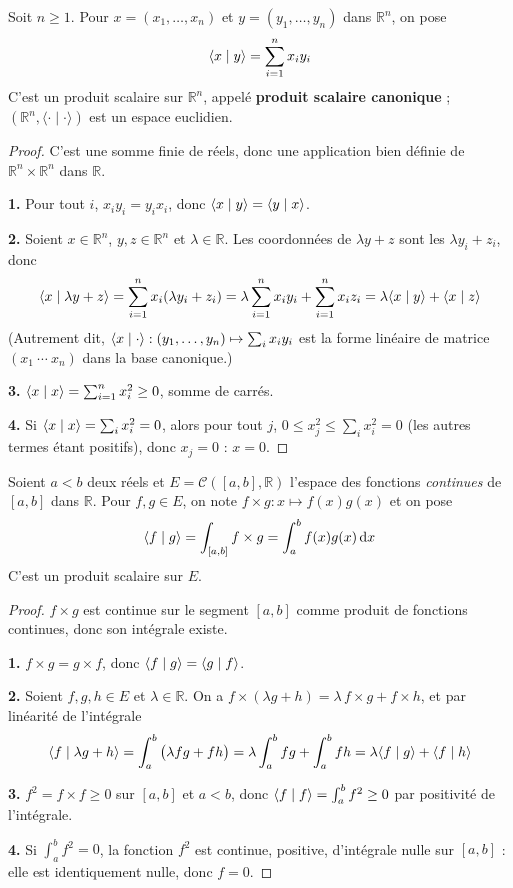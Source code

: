 \begin{exemple}
\label{ex:ps-canonique}
Soit $n\geq 1$. Pour $x=(x_1,\dots,x_n)$ et $y=(y_1,\dots,y_n)$ dans $\mathbb{R}^n$, on pose
\[\langle x\mid y\rangle=\sum_{i=1}^{n}x_iy_i\]
C'est un produit scalaire sur $\mathbb{R}^n$, appelé \textbf{produit scalaire canonique} ; $(\mathbb{R}^n,\langle\cdot\mid\cdot\rangle)$ est un espace euclidien.
\end{exemple}

\begin{proof}
C'est une somme finie de réels, donc une application bien définie de $\mathbb{R}^n\times\mathbb{R}^n$ dans $\mathbb{R}$.

\textbf{1.} Pour tout $i$, $x_iy_i=y_ix_i$, donc $\langle x\mid y\rangle=\langle y\mid x\rangle$.

\textbf{2.} Soient $x\in\mathbb{R}^n$, $y,z\in\mathbb{R}^n$ et $\lambda\in\mathbb{R}$. Les coordonnées de $\lambda y+z$ sont les $\lambda y_i+z_i$, donc
\[\langle x\mid \lambda y+z\rangle=\sum_{i=1}^nx_i(\lambda y_i+z_i)=\lambda\sum_{i=1}^nx_iy_i+\sum_{i=1}^nx_iz_i=\lambda\langle x\mid y\rangle+\langle x\mid z\rangle\]
(Autrement dit, $\langle x\mid \cdot\rangle:(y_1,\dots,y_n)\mapsto\sum_ix_iy_i$ est la forme linéaire de matrice $(x_1\ \cdots\ x_n)$ dans la base canonique.)

\textbf{3.} $\langle x\mid x\rangle=\sum_{i=1}^nx_i^2\geq 0$, somme de carrés.

\textbf{4.} Si $\langle x\mid x\rangle=\sum_ix_i^2=0$, alors pour tout $j$, $0\leq x_j^2\leq\sum_ix_i^2=0$ (les autres termes étant positifs), donc $x_j=0$ : $x=0$.
\end{proof}

\begin{exemple}
\label{ex:ps-integral}
Soient $a<b$ deux réels et $E=\mathcal{C}([a,b],\mathbb{R})$ l'espace des fonctions \emph{continues} de $[a,b]$ dans $\mathbb{R}$. Pour $f,g\in E$, on note $f\times g : x\mapsto f(x)g(x)$ et on pose
\[\langle f\mid g\rangle=\int_{[a,b]}f\times g=\int_a^bf(x)g(x)\,\mathrm{d}x\]
C'est un produit scalaire sur $E$.
\end{exemple}

\begin{proof}
$f\times g$ est continue sur le segment $[a,b]$ comme produit de fonctions continues, donc son intégrale existe.

\textbf{1.} $f\times g=g\times f$, donc $\langle f\mid g\rangle=\langle g\mid f\rangle$.

\textbf{2.} Soient $f,g,h\in E$ et $\lambda\in\mathbb{R}$. On a $f\times(\lambda g+h)=\lambda\,f\times g+f\times h$, et par linéarité de l'intégrale
\[\langle f\mid \lambda g+h\rangle=\int_a^b\big(\lambda fg+fh\big)=\lambda\int_a^bfg+\int_a^bfh=\lambda\langle f\mid g\rangle+\langle f\mid h\rangle\]

\textbf{3.} $f^2=f\times f\geq 0$ sur $[a,b]$ et $a<b$, donc $\langle f\mid f\rangle=\int_a^bf^2\geq 0$ par positivité de l'intégrale.

\textbf{4.} Si $\int_a^bf^2=0$, la fonction $f^2$ est continue, positive, d'intégrale nulle sur $[a,b]$ : elle est identiquement nulle, donc $f=0$.
\end{proof}

